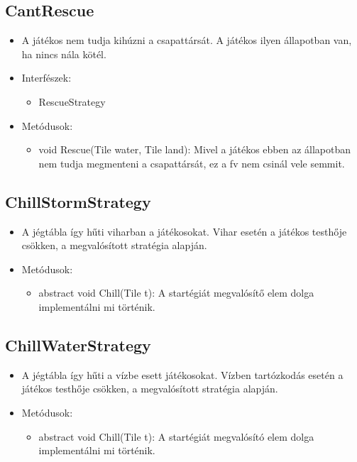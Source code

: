 \subsection{CantRescue}
\begin{itemize}
	\item A játékos nem tudja kihúzni a csapattársát. A játékos ilyen állapotban van, ha nincs nála kötél.
	\item Interfészek:
	\begin{itemize}
		\item RescueStrategy
	\end{itemize}
	\item Metódusok:
	\begin{itemize}
		\item void Rescue(Tile water, Tile land): Mivel a játékos ebben az állapotban nem tudja megmenteni a csapattársát, ez a fv nem csinál vele semmit. 
	\end{itemize}
\end{itemize}

\subsection{ChillStormStrategy}
\begin{itemize}
	\item A jégtábla így hűti viharban a játékosokat. Vihar esetén a játékos testhője csökken, a megvalósított stratégia alapján.
	\item Metódusok:
	\begin{itemize}
		\item abstract void Chill(Tile t): A startégiát megvalósítő elem dolga implementálni mi történik.
	\end{itemize}
\end{itemize}

\subsection{ChillWaterStrategy}
\begin{itemize}
	\item A jégtábla így hűti a vízbe esett játékosokat. Vízben tartózkodás esetén a játékos testhője csökken, a megvalósított stratégia alapján.
	\item Metódusok:
	\begin{itemize}
		\item abstract void Chill(Tile t): A startégiát megvalósító elem dolga implementálni mi történik.
	\end{itemize}
\end{itemize}

